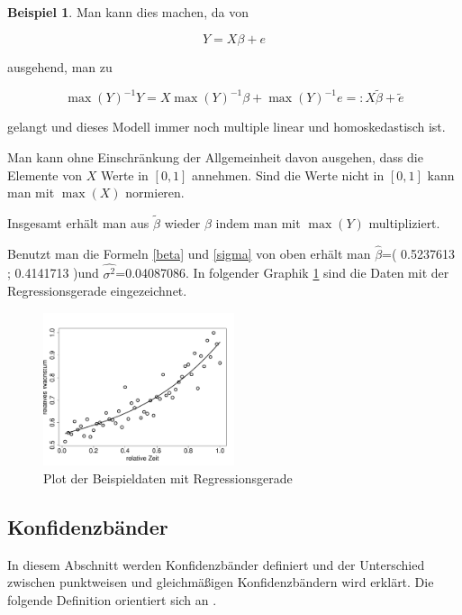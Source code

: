 \documentclass[12pt,a4paper]{article}
\theoremstyle{definition}
\newtheorem{Beispiel}[Definition]{Beispiel}
\theoremstyle{definition}
\theoremstyle{definition}
\theoremstyle{definition}
\newcommand{\betaoneest}{( 0.5237613 ; 0.4141713 )}
\newcommand{\sigmaoneest}{0.04087086}
\begin{document}
\begin{Beispiel}
Man kann dies machen, da von 

\begin{equation*}
Y=X\beta+e
\end{equation*}

ausgehend, man zu 

\begin{equation*}
\max(Y)^{-1} Y = X \max(Y)^{-1} \beta + \max(Y)^{-1} e =: X \tilde{\beta} + \tilde{e}
\end{equation*}

gelangt und dieses Modell immer noch multiple linear und homoskedastisch ist. 

Man kann ohne Einschränkung der Allgemeinheit davon ausgehen, dass die Elemente von $X$ Werte in $[0,1]$ annehmen. Sind die Werte nicht in $[0,1]$ kann man mit $\max(X)$ normieren.

Insgesamt erhält man aus $\tilde{\beta}$ wieder $\beta$ indem man mit $\max(Y)$ multipliziert.  

Benutzt man die Formeln \eqref{beta} und \eqref{sigma} von oben erhält man  $\hat{\beta}$=\betaoneest und $\widehat{\sigma^2}$=\sigmaoneest. In folgender Graphik \ref{Beispieldaten_Regressionsgerade} sind die Daten mit der Regressionsgerade eingezeichnet.

\begin{figure}[H] 
  \centering
     \includegraphics[width=0.5\textwidth]{regression-gerade}
  \caption{Plot der Beispieldaten mit Regressionsgerade}
  \label{Beispieldaten_Regressionsgerade}
\end{figure}
 
\end{Beispiel} 



\subsection{Konfidenzbänder}
\label{Konfidenzbaender}
In diesem Abschnitt werden Konfidenzbänder definiert und der Unterschied zwischen punktweisen und gleichmäßigen Konfidenzbändern wird erklärt. Die folgende Definition orientiert sich an \cite[229]{Georgii09}.
\end{document}
